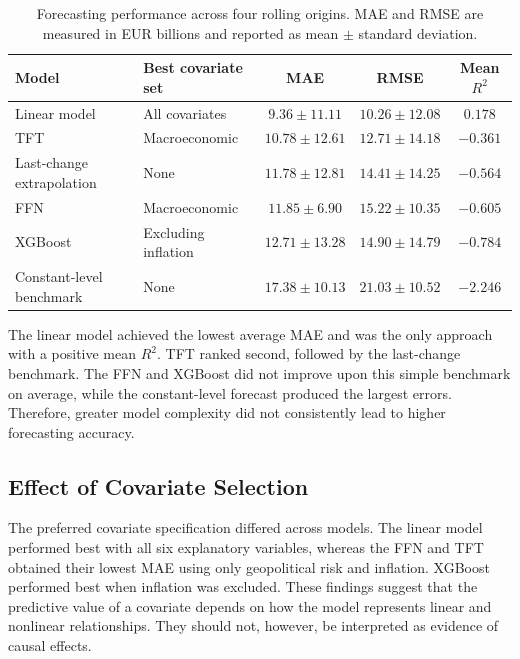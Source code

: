 \documentclass[11pt,a4paper]{article}
\begin{document}
\begin{table}[htbp]
\centering
\small
\caption{Forecasting performance across four rolling origins. MAE and RMSE
are measured in EUR billions and reported as mean $\pm$ standard deviation.}
\label{tab:overall_results}
\begin{tabularx}{\textwidth}{l X c c c}
\toprule
Model & Best covariate set & MAE & RMSE & Mean $R^2$ \\
\midrule
Linear model
& All covariates
& $9.36 \pm 11.11$
& $10.26 \pm 12.08$
& $0.178$ \\

TFT
& Macroeconomic
& $10.78 \pm 12.61$
& $12.71 \pm 14.18$
& $-0.361$ \\

Last-change extrapolation
& None
& $11.78 \pm 12.81$
& $14.41 \pm 14.25$
& $-0.564$ \\

FFN
& Macroeconomic
& $11.85 \pm 6.90$
& $15.22 \pm 10.35$
& $-0.605$ \\

XGBoost
& Excluding inflation
& $12.71 \pm 13.28$
& $14.90 \pm 14.79$
& $-0.784$ \\

Constant-level benchmark
& None
& $17.38 \pm 10.13$
& $21.03 \pm 10.52$
& $-2.246$ \\
\bottomrule
\end{tabularx}
\end{table}

The linear model achieved the lowest average MAE and was the only approach
with a positive mean $R^2$. TFT ranked second, followed by the last-change
benchmark. The FFN and XGBoost did not improve upon this simple benchmark on
average, while the constant-level forecast produced the largest errors.
Therefore, greater model complexity did not consistently lead to higher
forecasting accuracy.

\subsection{Effect of Covariate Selection}

The preferred covariate specification differed across models.
The linear model performed best with all six explanatory variables, whereas
the FFN and TFT obtained their lowest MAE using only geopolitical risk and
inflation. XGBoost performed best when inflation was excluded. These findings
suggest that the predictive value of a covariate depends on how the model
represents linear and nonlinear relationships. They should not, however, be
interpreted as evidence of causal effects.
\end{document}
